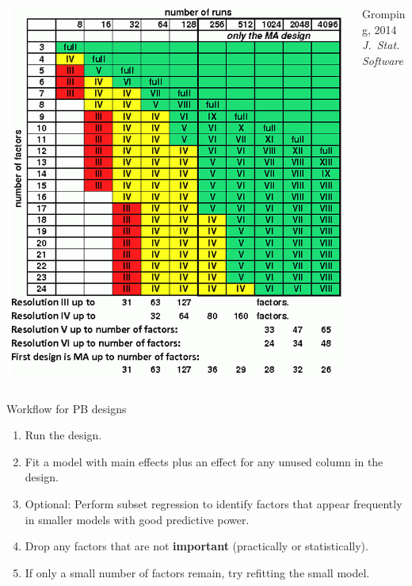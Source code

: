 \documentclass[
  10pt,
  ignorenonframetext,
]{beamer}
\providecommand{\tightlist}{%
  \setlength{\itemsep}{0pt}\setlength{\parskip}{0pt}}
\begin{document}
\begin{frame}{}
\protect\hypertarget{section}{}
\begin{columns}

\begin{column}{0.8\textwidth}
\begin{center}
\includegraphics[width=\textwidth]{frf2-resolution.png}
\end{center}
\end{column}

\begin{column}{0.2\textwidth}
{\footnotesize Gromping, 2014\\ \emph{J.\ Stat.\ Software}}
\end{column}

\end{columns}
\end{frame}

\begin{frame}{Workflow for PB designs}
\protect\hypertarget{workflow-for-pb-designs}{}
\begin{enumerate}
\tightlist
\item
  Run the design.
\item
  Fit a model with main effects plus an effect for any unused column in
  the design.
\item
  Optional: Perform subset regression to identify factors that appear
  frequently in smaller models with good predictive power.
\item
  Drop any factors that are not \textbf{important} (practically or
  statistically).
\item
  If only a small number of factors remain, try refitting the small
  model.
\end{enumerate}
\end{frame}
\end{document}
